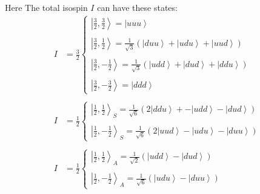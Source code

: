 \documentclass[10pt,a4paper]{article}
\newcommand{\ket}[1]{\left\vert #1 \right\rangle}
\begin{document}
     Here The total isospin $I$ can have these states:
     \begin{align}
          I &= \frac32 \left\{ \begin{matrix}
               \ket{\frac32, \frac32} = \ket{uuu}\\
               \ \\
               \ket{\frac32, \frac12} = \frac{1}{\sqrt 3}(\ket{duu} + \ket{udu} + \ket{uud})\\ \ \\
               \ket{\frac32,-\frac12} = \frac{1}{\sqrt3}(\ket{udd} + \ket{dud} + \ket{ddu})\\ \ \\
               \ket{\frac32, -\frac32} = \ket{ddd}
          \end{matrix}\right.
          \\
           \ \\ 
          I &= \frac12\left\{ \begin{matrix}
               \ket{\frac12,\frac12}_S = \frac{1}{\sqrt 6}(2\ket{ddu} + -\ket{udd} - \ket{dud}) \\ \ \\
               \ket{\frac12,-\frac12}_S = \frac{1}{\sqrt 6}(2\ket{uud} - \ket{udu} - \ket{duu})
          \end{matrix}\right.\\ \ \\
          I &= \frac12\left\{ \begin{matrix}
               \ket{\frac12,\frac12}_A = \frac{1}{\sqrt 2}(\ket{udd} - \ket{dud}) \\ \ \\
               \ket{\frac12,-\frac12}_A = \frac{1}{\sqrt 6}(\ket{udu} - \ket{duu})
          \end{matrix}\right.
     \end{align}
\end{document}
